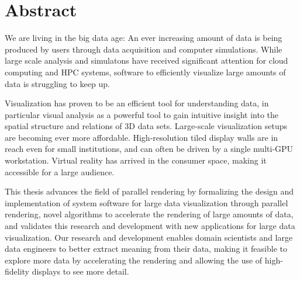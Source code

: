 


\chapter*{Abstract} 
We are living in the big data age: An ever increasing amount of data is being
produced by users through data acquisition and computer simulations. While
large scale analysis and simulatons have received significant attention for
cloud computing and HPC systems, software to efficiently visualize large
amounts of data is struggling to keep up.

Visualization has proven to be an efficient tool for understanding data, in
particular visual analysis as a powerful tool to gain intuitive insight into the
spatial structure and relations of 3D data sets. Large-scale visualization
setups are becoming ever more affordable. High-resolution tiled display walls
are in reach even for small institutions, and can often be driven by a single
multi-GPU workstation. Virtual reality has arrived in the consumer space,
making it accessible for a large audience.

This thesis advances the field of parallel rendering by formalizing the design
and implementation of system software for large data visualization through
parallel rendering, novel algorithms to accelerate the rendering of large
amounts of data, and validates this research and development with new
applications for large data visualization. Our research and development enables
domain scientists and large data engineers to better extract meaning from their
data, making it feasible to explore more data by accelerating the rendering and
allowing the use of high-fidelity displays to see more detail.

